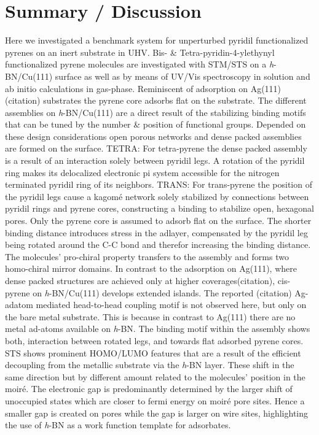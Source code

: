 \section{Summary / Discussion}
Here we investigated a benchmark system for unperturbed pyridil functionalized pyrenes on an inert substrate in UHV. Bis- \& Tetra-pyridin-4-ylethynyl functionalized pyrene molecules are investigated with STM/STS on a \textit{h}-BN/Cu(111) surface as well as by means of UV/Vis spectroscopy in solution and ab initio calculations in gas-phase.
Reminiscent of adsorption on Ag(111)(citation) substrates the pyrene core adsorbs flat on the substrate. The different assemblies on \textit{h}-BN/Cu(111) are a direct result of the stabilizing binding motifs that can be tuned by the number \& position of functional groups. Depended on these design considerations open porous networks and dense packed assemblies are formed on the surface.
TETRA: For tetra-pyrene the dense packed assembly is a result of an interaction solely between pyridil legs. A rotation of the pyridil ring makes its delocalized electronic pi system accessible for the nitrogen terminated pyridil ring of  its neighbors.
TRANS: For trans-pyrene the position of the pyridil legs cause a kagom\'e network solely stabilized by connections between pyridil rings and pyrene cores, constructing a binding to stabilize open, hexagonal pores. Only the pyrene core is assumed to adsorb flat on the surface. The shorter binding distance introduces stress in the adlayer, compensated by the pyridil leg being rotated around the C-C bond and therefor increasing the binding distance. The molecules’ pro-chiral property transfers to the assembly and forms two homo-chiral mirror domains. 
In contrast to the adsorption on Ag(111), where dense packed structures are achieved only at higher coverages(citation), cis-pyrene on \textit{h}-BN/Cu(111) develops extended islands. The reported (citation) Ag-adatom mediated head-to-head coupling motif is not observed here, but only on the bare metal substrate. This is because in contrast to Ag(111) there are no metal ad-atoms available on \textit{h}-BN. The binding motif within the assembly shows both, interaction between rotated legs, and towards flat adsorbed pyrene cores.
STS shows prominent HOMO/LUMO features that are a result of the efficient decoupling from the metallic substrate via the \textit{h}-BN layer. These shift in the same direction but by different amount related to the molecules' position in the moir\'e. The electronic gap is predominantly determined by the larger shift of unoccupied states which are closer to fermi energy on moir\'e pore sites. Hence a smaller gap is created on pores while the gap is larger on wire sites, highlighting the use of \textit{h}-BN as a work function template for adsorbates.
